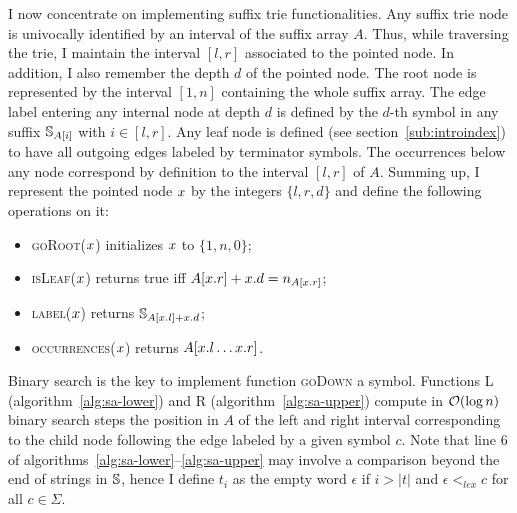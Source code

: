 I now concentrate on implementing suffix trie functionalities.
Any suffix trie node is univocally identified by an interval of the suffix array $A$.
Thus, while traversing the trie, I maintain the interval $[l,r]$ associated to the pointed node.
In addition, I also remember the depth $d$ of the pointed node.
The root node is represented by the interval $[1,n]$ containing the whole suffix array.
The edge label entering any internal node at depth $d$ is defined by the $d$-th symbol in any suffix $\mathbb {S}_{A[i]}$ with $i \in [l,r]$.
Any leaf node is defined (see section~\ref{sub:introindex}) to have all outgoing edges labeled by terminator symbols.
The occurrences below any node correspond by definition to the interval $[l,r]$ of $A$.
Summing up, I represent the pointed node $x$ by the integers $\{ l, r ,d \}$ and define the following operations on it:
\begin{itemize}
\item \textsc{goRoot}($x$) initializes $x$ to $\{ 1, n, 0\}$;
\item \textsc{isLeaf}($x$) returns true iff $A[x.r] + x.d = n_{A[x.r]}$;
\item \textsc{label}($x$) returns $\mathbb {S}_{A[x.l] + x.d}$;
\item \textsc{occurrences}($x$) returns $A[x.l \dots x.r]$.
\end{itemize}

Binary search is the key to implement function \textsc{goDown} a symbol.
Functions \textsc{L} (algorithm~\ref{alg:sa-lower}) and \textsc{R} (algorithm~\ref{alg:sa-upper}) compute in $\mathcal{O}(\log{n})$ binary search steps the position in $A$ of the left and right interval corresponding to the child node following the edge labeled by a given symbol $c$.
Note that line 6 of algorithms~\ref{alg:sa-lower}--\ref{alg:sa-upper} may involve a comparison beyond the end of strings in $\mathbb {S}$, hence I define $t_i$ as the empty word $\epsilon$ if $i > |t|$ and $\epsilon <_{lex} c$ for all $c \in \Sigma$.

